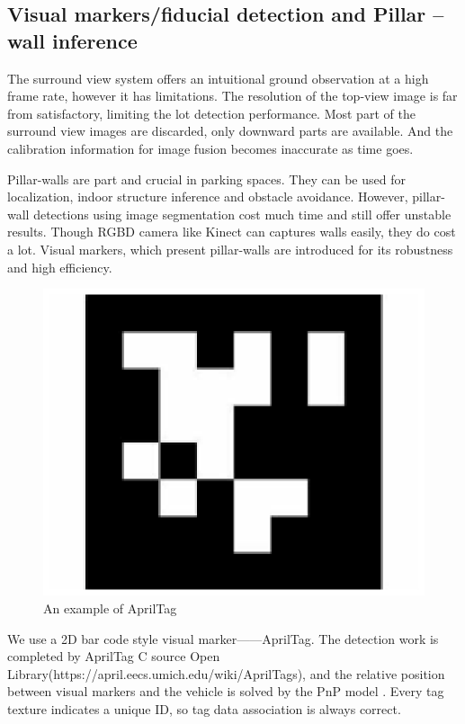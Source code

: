 \documentclass[journal]{IEEEtran}
\begin{document}

\subsection{Visual markers/fiducial detection and Pillar – wall inference }

The surround view system offers an intuitional ground observation at a high frame rate, however it has limitations. 
The resolution of the top-view image is far from satisfactory, limiting the lot detection performance. 
Most part of the surround view images are discarded, only downward parts are available. 
And the calibration information for image fusion becomes inaccurate as time goes.

Pillar-walls are part and crucial in parking spaces. 
They can be used for localization, indoor structure inference and obstacle avoidance. 
However, pillar-wall detections using image segmentation cost much time and still offer unstable results. 
Though RGBD camera like Kinect can captures walls easily, they do cost a lot. 
Visual markers, which present pillar-walls are introduced for its robustness and high efficiency.


\begin{figure}
\centering
\includegraphics{pic/fig6_Visual_markers}
\caption{An example of AprilTag}\label{fig:6}
\end{figure}

We use a 2D bar code style visual marker——AprilTag. 
The detection work is completed by AprilTag C source Open Library(https://april.eecs.umich.edu/wiki/AprilTags)\cite{Olson2011AprilTag}, and the relative position between visual markers and the vehicle is solved by the PnP model \cite{Hartley2003Multiple}. 
Every tag texture indicates a unique ID, so tag data association is always correct.
\end{document}
